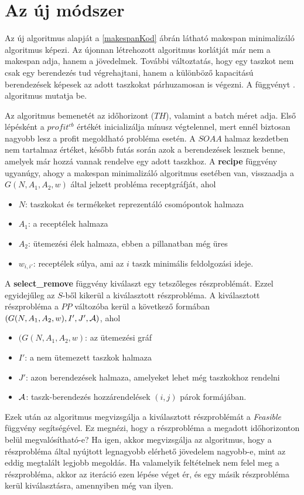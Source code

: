 \chapter{Az új módszer}
Az új algoritmus alapját a \ref{makespanKod} ábrán látható makespan minimalizáló algoritmus képezi. Az újonnan létrehozott algoritmus korlátját már nem a makespan adja, hanem a jövedelmek. További változtatás, hogy egy taszkot nem csak egy berendezés tud végrehajtani, hanem a különböző kapacitású berendezések képesek az adott taszkokat párhuzamosan is végezni. A függvényt . algoritmus mutatja be.

Az algoritmus bemenetét az időhorizont ($TH$), valamint a batch méret adja. Első lépésként a $profit^{cb}$ értékét inicializálja mínusz végtelennel, mert ennél biztosan nagyobb lesz a profit megoldható probléma esetén. A $SOAA$ halmaz kezdetben nem tartalmaz értéket, később futás során azok a berendezések lesznek benne, amelyek már hozzá vannak rendelve egy adott taszkhoz. A \textbf{recipe} függvény ugyanúgy, ahogy a makespan minimalizáló algoritmus esetében van, visszaadja a $G(N,A_1,A_2,w)$ által jelzett probléma receptgráfját, ahol
\begin{itemize}
  \item[] $N$: taszkokat és termékeket reprezentáló csomópontok halmaza	
  \item[] $A_1$: a receptélek halmaza
  \item[] $A_2$: ütemezési élek halmaza, ebben a pillanatban még üres
  \item[] $w_{i,i'}$: receptélek súlya, ami az $i$ taszk minimális feldolgozási ideje.
\end{itemize} 

A \textbf{select\_remove} függvény kiválaszt egy tetszőleges részproblémát. Ezzel egyidejűleg az $S$-ből kikerül a kiválasztott részprobléma. A kiválasztott részprobléma a $PP$ változóba kerül a következő formában  $(G(N,A_1,A_2,w),I',J',{\cal A})$, ahol 
\begin{itemize}
  \item[] $(G(N,A_1,A_2,w)$: az ütemezési gráf	
  \item[] $I'$: a nem ütemezett taszkok halmaza
  \item[] $J'$: azon berendezések halmaza, amelyeket lehet még taszkokhoz rendelni
  \item[] ${\cal A}$: taszk-berendezés hozzárendelések $(i,j)$ párok formájában.
\end{itemize}

Ezek után az algoritmus megvizsgálja a kiválasztott részproblémát a \textit{Feasible} függvény segítségével. Ez megnézi, hogy a részprobléma a megadott időhorizonton belül megvalósítható-e? Ha igen, akkor megvizsgálja az algoritmus, hogy a részprobléma által nyújtott legnagyobb elérhető jövedelem nagyobb-e, mint az eddig megtalált legjobb megoldás. Ha valamelyik feltételnek nem felel meg a részprobléma, akkor az iteráció ezen lépése véget ér, és egy másik részprobléma kerül kiválasztásra, amennyiben még van ilyen.

